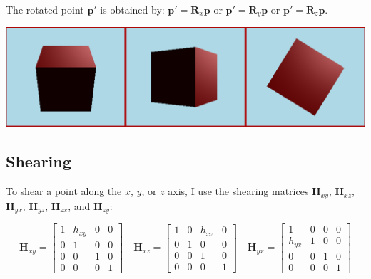 \documentclass{article}
\begin{document}
	
	The rotated point \(\bm{p}'\) is obtained by: \(\bm{p}' = \bm{R}_x \bm{p}\) or \(\bm{p}' = \bm{R}_y \bm{p}\) or \(\bm{p}' = \bm{R}_z \bm{p}\).
	
	\begin{center} \includegraphics[width=1\textwidth]{homogenious_notation_images/rotate.jpg}  \end{center}
		
	\subsection{Shearing}
	To shear a point along the \(x\), \(y\), or \(z\) axis, I use the shearing matrices \(\bm{H}_{xy}\), \(\bm{H}_{xz}\), \(\bm{H}_{yx}\), \(\bm{H}_{yz}\), \(\bm{H}_{zx}\), and \(\bm{H}_{zy}\):
	
	
	\[
	\bm{H}_{xy} = \begin{bmatrix}
		1 & h_{xy} & 0 & 0 \\
		0 & 1 & 0 & 0 \\
		0 & 0 & 1 & 0 \\
		0 & 0 & 0 & 1
	\end{bmatrix}
	\quad
	\bm{H}_{xz} = \begin{bmatrix}
		1 & 0 & h_{xz} & 0 \\
		0 & 1 & 0 & 0 \\
		0 & 0 & 1 & 0 \\
		0 & 0 & 0 & 1
	\end{bmatrix}
	\quad
	\bm{H}_{yx} = \begin{bmatrix}
		1 & 0 & 0 & 0 \\
		h_{yx} & 1 & 0 & 0 \\
		0 & 0 & 1 & 0 \\
		0 & 0 & 0 & 1
	\end{bmatrix}
	\]
	
	
	
\end{document}
